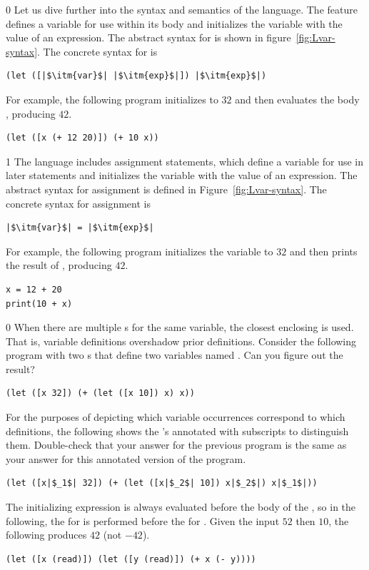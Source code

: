 \documentclass[7x10]{TimesAPriori_MIT}%
\def\racketEd{0}
\def\pythonEd{1}
\def\edition{1}
\newcommand{\pythonColor}[0]{}
\numberwithin{theorem}{chapter}
\numberwithin{definition}{chapter}
\numberwithin{equation}{chapter}
\begin{document}
{\if\edition\racketEd
Let us dive further into the syntax and semantics of the \LangVar{}
language.  The  feature defines a variable for use within its
body and initializes the variable with the value of an expression.
The abstract syntax for  is shown in
figure~\ref{fig:Lvar-syntax}.  The concrete syntax for  is
\begin{lstlisting}
(let ([|$\itm{var}$| |$\itm{exp}$|]) |$\itm{exp}$|)
\end{lstlisting}
For example, the following program initializes  to $32$ and then
evaluates the body , producing $42$.
\begin{lstlisting}
(let ([x (+ 12 20)]) (+ 10 x))
\end{lstlisting}
\fi}
%
{\if\edition\pythonEd\pythonColor
%
The \LangVar{} language includes assignment statements, which define a
variable for use in later statements and initializes the variable with
the value of an expression.  The abstract syntax for assignment is
defined in Figure~\ref{fig:Lvar-syntax}.  The concrete syntax for
assignment is 
\begin{lstlisting}
|$\itm{var}$| = |$\itm{exp}$|
\end{lstlisting}
For example, the following program initializes the variable 
to $32$ and then prints the result of , producing $42$.
\begin{lstlisting}
x = 12 + 20
print(10 + x)
\end{lstlisting}
\fi}

{\if\edition\racketEd
%  
When there are multiple s for the same variable, the closest
enclosing  is used. That is, variable definitions overshadow
prior definitions. Consider the following program with two s
that define two variables named . Can you figure out the
result?
\begin{lstlisting}
(let ([x 32]) (+ (let ([x 10]) x) x))
\end{lstlisting}
For the purposes of depicting which variable occurrences correspond to
which definitions, the following shows the 's annotated with
subscripts to distinguish them. Double-check that your answer for the
previous program is the same as your answer for this annotated version
of the program.
\begin{lstlisting}
(let ([x|$_1$| 32]) (+ (let ([x|$_2$| 10]) x|$_2$|) x|$_1$|))
\end{lstlisting}
The initializing expression is always evaluated before the body of the
, so in the following, the  for  is
performed before the  for . Given the input
$52$ then $10$, the following produces $42$ (not $-42$).
\begin{lstlisting}
(let ([x (read)]) (let ([y (read)]) (+ x (- y))))
\end{lstlisting}
\fi}
\end{document}
